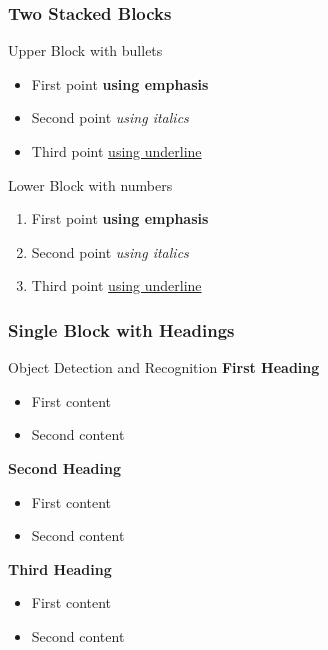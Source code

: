 
\begin{frame}
  \frametitle{Two Stacked Blocks}
  \begin{block}{Upper Block with bullets}
    \begin{itemize}
      \item First point \textbf{using emphasis}
      \item Second point \textit{using italics}
      \item Third point \underline{using underline}
    \end{itemize}
  \end{block}
  \begin{block}{Lower Block with numbers}
    \begin{enumerate}
      \item First point \textbf{using emphasis}
      \item Second point \textit{using italics}
      \item Third point \underline{using underline}
    \end{enumerate}
  \end{block}
\end{frame}

\begin{frame}
  \frametitle{Single Block with Headings}
  \begin{block}{Object Detection and Recognition}
    \textbf{First Heading}
    \begin{itemize}
      \item First content
      \item Second content
    \end{itemize}
    \textbf{Second Heading}
    \begin{itemize}
      \item First content
      \item Second content
    \end{itemize}
    \textbf{Third Heading}
    \begin{itemize}
      \item First content
      \item Second content
    \end{itemize}
  \end{block}
\end{frame}

